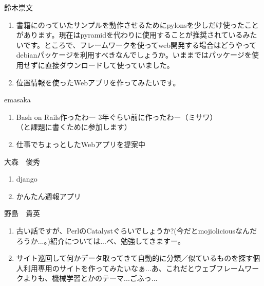 \begin{prework}{ 鈴木崇文 }
\begin{enumerate}
\item 書籍にのっていたサンプルを動作させるためにpylonsを少しだけ使ったことがあります。現在はpyramidを代わりに使用することが推奨されているみたいです。ところで、フレームワークを使ってweb開発する場合はどうやってdebianパッケージを利用すべきなんでしょうか。いままではパッケージを使用せずに直接ダウンロードして使っていました。
\item 位置情報を使ったWebアプリを作ってみたいです。
\end{enumerate}
\end{prework}

\begin{prework}{ emasaka }
\begin{enumerate}
\item Bash on Rails作ったわー 3年ぐらい前に作ったわー（ミサワ）\\
（と課題に書くために参加します）
\item 仕事でちょっとしたWebアプリを提案中
\end{enumerate}
\end{prework}

\begin{prework}{ 大森　俊秀 }
\begin{enumerate}
\item django
\item かんたん週報アプリ
\end{enumerate}
\end{prework}
\begin{prework}{ 野島　貴英 }
\begin{enumerate}
\item 古い話ですが、PerlのCatalystぐらいでしょうか?(今だとmojioliciousなんだろうか...。)紹介については...べ、勉強してきますー。
\item サイト巡回して何かデータ取ってきて自動的に分類／似ているものを探す個人利用専用のサイトを作ってみたいなぁ...あ、これだとウェブフレームワークよりも、機械学習とかのテーマ...ごふっ...
\end{enumerate}
\end{prework}
